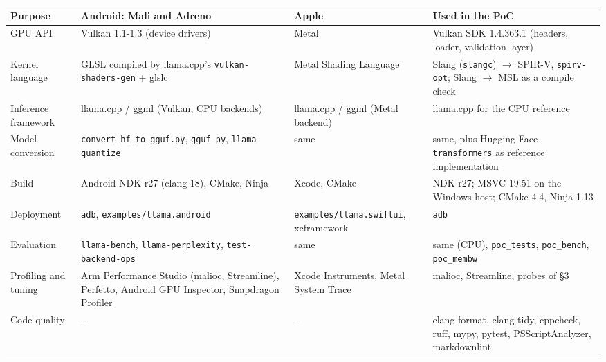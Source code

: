 \documentclass[
  10pt,
]{article}
\newcounter{none} %
\begin{document}
{\def\LTcaptype{none} %
\begin{longtable}[]{@{}
  >{\raggedright\arraybackslash}p{}
  >{\raggedright\arraybackslash}p{}
  >{\raggedright\arraybackslash}p{}
  >{\raggedright\arraybackslash}p{}@{}}
\toprule\noalign{}
\begin{minipage}[b]{\linewidth}\raggedright%
Purpose
\end{minipage} & \begin{minipage}[b]{\linewidth}\raggedright%
Android: Mali and Adreno
\end{minipage} & \begin{minipage}[b]{\linewidth}\raggedright%
Apple
\end{minipage} & \begin{minipage}[b]{\linewidth}\raggedright%
Used in the PoC
\end{minipage} \\
\midrule\noalign{}
\endhead%
\bottomrule\noalign{}
\endlastfoot%
GPU API & Vulkan 1.1-1.3 (device drivers) & Metal & Vulkan SDK 1.4.363.1
(headers, loader, validation layer) \\
Kernel language & GLSL compiled by llama.cpp's
\texttt{vulkan-shaders-gen} + glslc & Metal Shading Language & Slang
(\texttt{slangc}) $\rightarrow$ SPIR-V, \texttt{spirv-opt}; Slang $\rightarrow$ MSL as a compile
check \\
Inference framework & llama.cpp / ggml (Vulkan, CPU backends) &
llama.cpp / ggml (Metal backend) & llama.cpp for the CPU reference \\
Model conversion & \texttt{convert\_hf\_to\_gguf.py}, \texttt{gguf-py},
\texttt{llama-quantize} & same & same, plus Hugging Face
\texttt{transformers} as reference implementation \\
Build & Android NDK r27 (clang 18), CMake, Ninja & Xcode, CMake & NDK
r27; MSVC 19.51 on the Windows host; CMake 4.4, Ninja 1.13 \\
Deployment & \texttt{adb}, \texttt{examples/llama.android} &
\texttt{examples/llama.swiftui}, xcframework & \texttt{adb} \\
Evaluation & \texttt{llama-bench}, \texttt{llama-perplexity},
\texttt{test-backend-ops} & same & same (CPU), \texttt{poc\_tests},
\texttt{poc\_bench}, \texttt{poc\_membw} \\
Profiling and tuning & Arm Performance Studio (malioc, Streamline),
Perfetto, Android GPU Inspector, Snapdragon Profiler & Xcode
Instruments, Metal System Trace & malioc, Streamline, probes of \S{}3 \\
Code quality & -- & -- & clang-format, clang-tidy, cppcheck, ruff, mypy,
pytest, PSScriptAnalyzer, markdownlint \\
\end{longtable}
}
\end{document}
